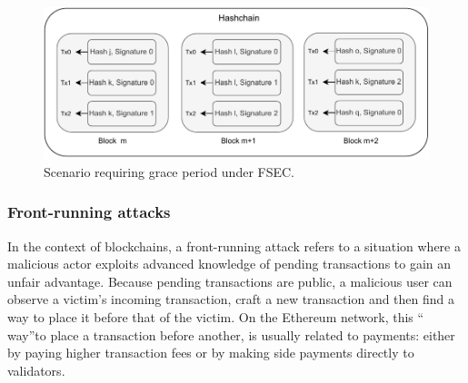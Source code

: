 \begin{figure}
  \centering
  \includegraphics[scale=0.5]{figures/grace_period.pdf}
  \caption{Scenario requiring grace period under FSEC.}
  \label{fig:grace_period}
\end{figure}


\subsubsection{Front-running attacks}
In the context of blockchains, a front-running attack refers to a situation where
a malicious actor exploits advanced knowledge of pending transactions to gain an
unfair advantage. Because pending transactions are public, a malicious user can
observe a victim's incoming transaction, craft a new transaction and then find a way
to place it before that of the victim. On the Ethereum network, this \textquotedblleft
way\textquotedblright to place a transaction before another, is usually related
to payments: either by paying higher transaction fees or by making side payments
directly to validators.

